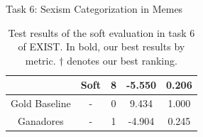 \begin{frame}{Task 6: Sexism Categorization in Memes}
{\begin{table}[]
\begin{adjustbox}{width=0.95\textwidth}
\begin{tabular}{|c|c|c|c|c|}
                                                                                             & Soft  & 8           & -5.550              & 0.206                    \\ \hline \hline
            Gold Baseline                                                                    & -     & 0           & 9.434               & 1.000                    \\ \hline
            Ganadores                                                                        & -     & 1           & -4.904              & 0.245                    \\ \hline
            \end{tabular}%
    \end{adjustbox}

    
    \caption{Test results of the soft evaluation in task 6 of EXIST. In bold, our best results by metric. $\dagger$ denotes our best ranking.}
    \label{tab:t6_exist_soft}
    \end{table}
    }
\end{frame}